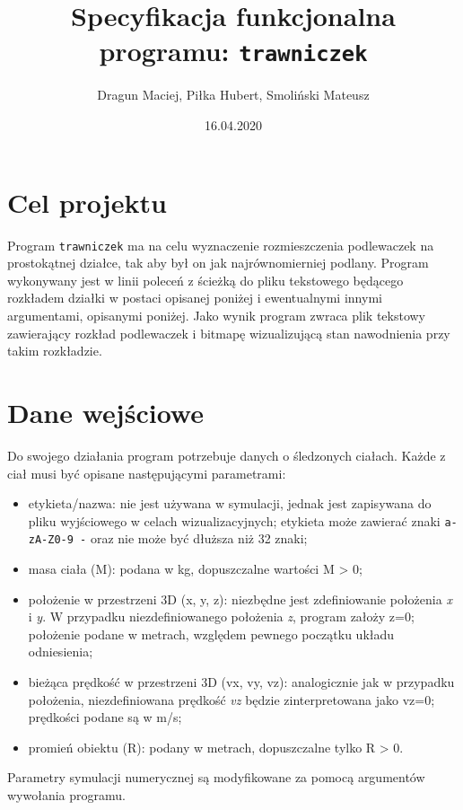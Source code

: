 \documentclass[]{article}
\title{Specyfikacja funkcjonalna programu: \texttt{trawniczek}}
\author{Dragun Maciej, Piłka Hubert, Smoliński Mateusz}
\date{16.04.2020}
\begin{document}
\maketitle

\section{Cel projektu}\label{header-n231}

Program \texttt{trawniczek} ma na celu wyznaczenie rozmieszczenia podlewaczek na prostokątnej działce,
tak aby był on jak najrównomierniej podlany. Program wykonywany jest w linii poleceń z ścieżką do pliku
tekstowego będącego rozkładem działki w postaci opisanej poniżej i ewentualnymi innymi argumentami, opisanymi poniżej. Jako wynik program zwraca plik tekstowy zawierający rozkład podlewaczek i bitmapę 
wizualizującą stan nawodnienia przy takim rozkładzie.

\section{Dane wejściowe}\label{header-n233}

Do swojego działania program potrzebuje danych o śledzonych ciałach.
Każde z ciał musi być opisane następującymi parametrami:

\begin{itemize}
\item
  etykieta/nazwa: nie jest używana w symulacji, jednak jest zapisywana
  do pliku wyjściowego w celach wizualizacyjnych; etykieta może zawierać
  znaki \texttt{a-zA-Z0-9\ -} oraz nie może być dłuższa niż 32 znaki;
\item
  masa ciała (M): podana w kg, dopuszczalne wartości M \textgreater{} 0;
\item
  położenie w przestrzeni 3D (x, y, z): niezbędne jest zdefiniowanie
  położenia \emph{x} i \emph{y}. W przypadku niezdefiniowanego położenia
  \emph{z}, program założy z=0; położenie podane w metrach, względem
  pewnego początku układu odniesienia;
\item
  bieżąca prędkość w przestrzeni 3D (vx, vy, vz): analogicznie jak w
  przypadku położenia, niezdefiniowana prędkość \emph{vz} będzie
  zinterpretowana jako vz=0; prędkości podane są w m/s;
\item
  promień obiektu (R): podany w metrach, dopuszczalne tylko R
  \textgreater{} 0.
\end{itemize}

Parametry symulacji numerycznej są modyfikowane za pomocą argumentów
wywołania programu.
\end{document}
